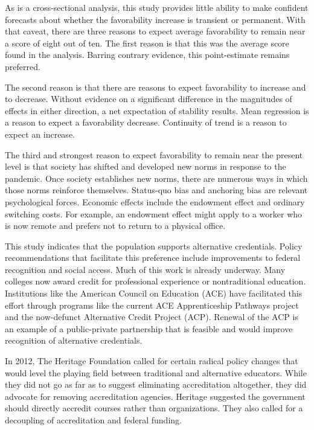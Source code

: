 \documentclass[review]{elsarticle}
\begin{document}
As is a cross-sectional analysis,
this study provides little ability to make confident forecasts about whether the favorability increase is transient or permanent.
With that caveat, there are three reasons to expect average favorability to remain near a score of eight out of ten.
The first reason is that this was the average score found in the analysis.
Barring contrary evidence, this point-estimate remains preferred.

The second reason is that there are reasons to expect favorability to increase and to decrease.
Without evidence on a significant difference in the magnitudes of effects in either direction,
a net expectation of stability results.
Mean regression is a reason to expect a favorability decrease.
Continuity of trend is a reason to expect an increase.

The third and strongest reason to expect favorability to remain near the present level is that
society has shifted and developed new norms in response to the pandemic.
Once society establishes new norms, there are numerous ways in which those norms reinforce themselves.
Status-quo bias and anchoring bias are relevant psychological forces.
Economic effects include the endowment effect and ordinary switching costs.
For example, an endowment effect might apply to a worker who is now remote and prefers not to return to a physical office.

This study indicates that the population supports alternative credentials.
Policy recommendations that facilitate this preference include improvements to federal recognition and social access.
Much of this work is already underway.
Many colleges now award credit for professional experience or nontraditional education.
Institutions like the American Council on Education (ACE)
have facilitated this effort through programs like the current ACE Apprenticeship Pathways project
and the now-defunct Alternative Credit Project (ACP)\cite{education_2021}.
Renewal of the ACP is an example of a public-private partnership that is feasible and would improve recognition of alternative credentials.

In 2012, The Heritage Foundation called for certain radical policy changes that would level the playing field between traditional and alternative educators.
While they did not go as far as to suggest eliminating accreditation altogether,
they did advocate for removing accreditation agencies.
Heritage suggested the government should directly accredit courses rather than organizations\cite{burke2012accreditation}.
They also called for a decoupling of accreditation and federal funding.
\end{document}

